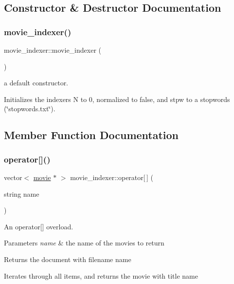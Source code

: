 \subsection{Constructor \& Destructor Documentation}
\mbox{\label{classmovie__indexer_a24fcbe6f81f28e9007202cd96df5e191}} 
\subsubsection{\texorpdfstring{movie\+\_\+indexer()}{movie\_indexer()}}
{\footnotesize\ttfamily movie\+\_\+indexer\+::movie\+\_\+indexer (\begin{DoxyParamCaption}{ }\end{DoxyParamCaption})}



a default constructor. 

Initializes the indexer\textquotesingle{}s N to 0, normalized to false, and stpw to a stopwords (\char`\"{}stopwords.\+txt\char`\"{}). 

\subsection{Member Function Documentation}
\mbox{\label{classmovie__indexer_a5b7aa1d935689ad1afbcfe2c877d3ae9}} 
\subsubsection{\texorpdfstring{operator[]()}{operator[]()}\hspace{0.1cm}{\footnotesize\ttfamily [1/2]}}
{\footnotesize\ttfamily vector$<$ \hyperlink{classmovie}{movie} $\ast$ $>$ movie\+\_\+indexer\+::operator\mbox{[}$\,$\mbox{]} (\begin{DoxyParamCaption}\item[{string}]{name }\end{DoxyParamCaption})}



An operator\mbox{[}\mbox{]} overload. 


\begin{DoxyParams}{Parameters}
{\em name} & the name of the movies to return \\
\hline
\end{DoxyParams}
\begin{DoxyReturn}{Returns}
the document with filename name
\end{DoxyReturn}
Iterates through all items, and returns the movie with title name \mbox{\label{classmovie__indexer_aeaadd1ac660403a0f55122c6afea3acc}} 
